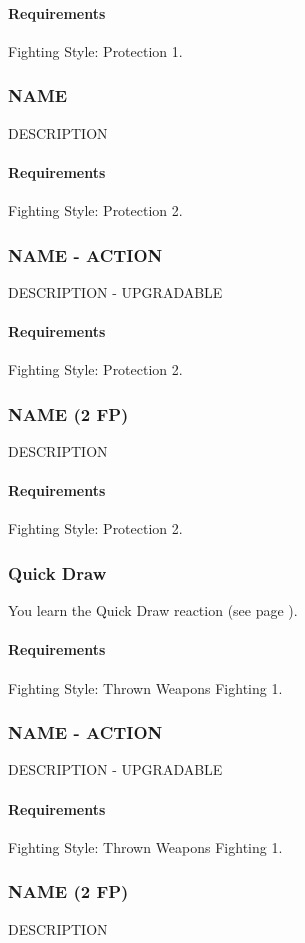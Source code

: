     \paragraph{Requirements} Fighting Style: Protection 1.
\subsubsection{NAME} \label{feat::name}
    DESCRIPTION
    \paragraph{Requirements} Fighting Style: Protection 2.
\subsubsection{NAME - ACTION} \label{feat::name}
    DESCRIPTION - UPGRADABLE
    \paragraph{Requirements} Fighting Style: Protection 2.
\subsubsection{NAME (2 FP)} \label{feat::name}
    DESCRIPTION
    \paragraph{Requirements} Fighting Style: Protection 2.
\subsubsection{Quick Draw} \label{feat::quickdraw}
    You learn the Quick Draw reaction (see page \pageref{act::quickdraw}).
    \paragraph{Requirements} Fighting Style: Thrown Weapons Fighting 1.
\subsubsection{NAME - ACTION} \label{feat::name}
    DESCRIPTION - UPGRADABLE
    \paragraph{Requirements} Fighting Style: Thrown Weapons Fighting 1.
\subsubsection{NAME (2 FP)} \label{feat::name}
    DESCRIPTION

